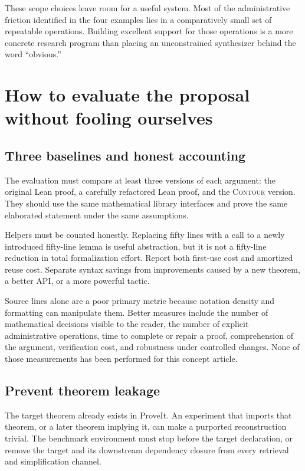 \documentclass[11pt,a4paper]{article}
\newcommand{\contour}{\textsc{Contour}}
\begin{document}
These scope choices leave room for a useful system. Most of the administrative friction identified in the four examples lies in a comparatively small set of repeatable operations. Building excellent support for those operations is a more concrete research program than placing an unconstrained synthesizer behind the word ``obvious.''

\section{How to evaluate the proposal without fooling ourselves}
\label{sec:evaluation}

\subsection{Three baselines and honest accounting}

The evaluation must compare at least three versions of each argument: the original Lean proof, a carefully refactored Lean proof, and the \contour{} version. They should use the same mathematical library interfaces and prove the same elaborated statement under the same assumptions.

Helpers must be counted honestly. Replacing fifty lines with a call to a newly introduced fifty-line lemma is useful abstraction, but it is not a fifty-line reduction in total formalization effort. Report both first-use cost and amortized reuse cost. Separate syntax savings from improvements caused by a new theorem, a better API, or a more powerful tactic.

Source lines alone are a poor primary metric because notation density and formatting can manipulate them. Better measures include the number of mathematical decisions visible to the reader, the number of explicit administrative operations, time to complete or repair a proof, comprehension of the argument, verification cost, and robustness under controlled changes. None of those measurements has been performed for this concept article.

\subsection{Prevent theorem leakage}

The target theorem already exists in ProveIt. An experiment that imports that theorem, or a later theorem implying it, can make a purported reconstruction trivial. The benchmark environment must stop before the target declaration, or remove the target and its downstream dependency closure from every retrieval and simplification channel.
\end{document}
